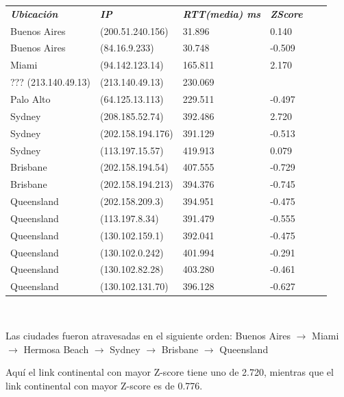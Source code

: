 \begin{center}
\begin{tabular}{llllll}
	\textit{\textbf{Ubicaci\'on}}	&	\textit{\textbf{IP}}	&	\textit{\textbf{RTT(media) ms}}	&	\textit{\textbf{ZScore}}	\\
		Buenos Aires		&	(200.51.240.156)		&	31.896		&	0.140	\\
		Buenos Aires		&	(84.16.9.233)		&	30.748		&	-0.509	\\
		\intercontinental
		Miami		&	(94.142.123.14)		&	165.811		&	2.170	\\
		??? (213.140.49.13)		&	(213.140.49.13)		&	230.069		&	\highestcontinental 0.776	\\
		Palo Alto		&	(64.125.13.113)		&	229.511		&	-0.497	\\
		\intercontinental
		Sydney		&	(208.185.52.74)		&	392.486		&	2.720	\\
		Sydney		&	(202.158.194.176)		&	391.129		&	-0.513	\\
		Sydney		&	(113.197.15.57)		&	419.913		&	0.079	\\
		Brisbane		&	(202.158.194.54)		&	407.555		&	-0.729	\\
		Brisbane		&	(202.158.194.213)		&	394.376		&	-0.745	\\
		Queensland		&	(202.158.209.3)		&	394.951		&	-0.475	\\
		Queensland		&	(113.197.8.34)		&	391.479		&	-0.555	\\
		Queensland		&	(130.102.159.1)		&	392.041		&	-0.475	\\
		Queensland		&	(130.102.0.242)		&	401.994		&	-0.291	\\
		Queensland		&	(130.102.82.28)		&	403.280		&	-0.461	\\
		Queensland		&	(130.102.131.70)		&	396.128		&	-0.627	\\
\end{tabular}
\end{center}

~

Las ciudades fueron atravesadas en el siguiente orden:
Buenos Aires $\rightarrow$ Miami $\rightarrow$ Hermosa Beach $\rightarrow$ Sydney $\rightarrow$ Brisbane $\rightarrow$ Queensland

Aqu\'i el link continental con mayor Z-score tiene uno de 2.720, mientras que el link continental con mayor
Z-score es de 0.776.

~

